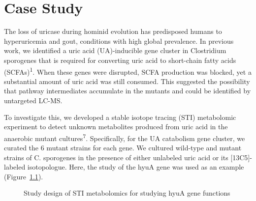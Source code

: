 \documentclass[
  letterpaper,
  DIV=11,
  numbers=noendperiod]{scrreprt}
\begin{document}

\chapter{Case Study}\label{sec-case-study}

The loss of uricase during hominid evolution has predisposed humans to
hyperuricemia and gout, conditions with high global prevalence. In
previous work, we identified a uric acid (UA)-inducible gene cluster in
Clostridium sporogenes that is required for converting uric acid to
short-chain fatty acids (SCFAs)\textsuperscript{1}. When these genes
were disrupted, SCFA production was blocked, yet a substantial amount of
uric acid was still consumed. This suggested the possibility that
pathway intermediates accumulate in the mutants and could be identified
by untargeted LC-MS.

To investigate this, we developed a stable isotope tracing (STI)
metabolomic experiment to detect unknown metabolites produced from uric
acid in the anaerobic mutant cultures\textsuperscript{7}. Specifically,
for the UA catabolism gene cluster, we curated the 6 mutant strains for
each gene. We cultured wild-type and mutant strains of C. sporogenes in
the presence of either unlabeled uric acid or its {[}13C5{]}-labeled
isotopologue. Here, the study of the hyuA gene was used as an example
(Figure~\ref{fig-figure4-1}).

\begin{figure}


\caption{\label{fig-figure4-1}Study design of STI metabolomics for
studying hyuA gene functions}

\end{figure}%
\end{document}
